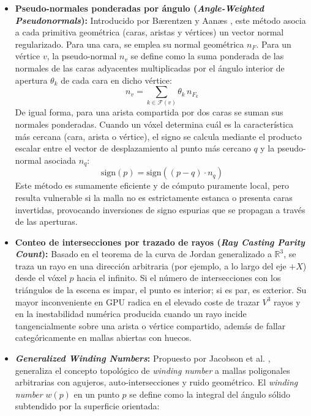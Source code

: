 \begin{itemize}
  \item \textbf{Pseudo-normales ponderadas por ángulo (\textit{Angle-Weighted Pseudonormals}):} Introducido por Bærentzen y Aanæs \cite{baerentzen2005}, este método asocia a cada primitiva geométrica (caras, aristas y vértices) un vector normal regularizado. Para una cara, se emplea su normal geométrica $n_F$. Para un vértice $v$, la pseudo-normal $n_v$ se define como la suma ponderada de las normales de las caras adyacentes multiplicadas por el ángulo interior de apertura $\theta_k$ de cada cara en dicho vértice:
  \begin{equation}
    n_v = \sum_{k \in \mathcal{F}(v)} \theta_k \, n_{F_k}
  \end{equation}
  De igual forma, para una arista compartida por dos caras se suman sus normales ponderadas. Cuando un vóxel determina cuál es la característica más cercana (cara, arista o vértice), el signo se calcula mediante el producto escalar entre el vector de desplazamiento al punto más cercano $q$ y la pseudo-normal asociada $n_q$:
  \begin{equation}
    \text{sign}(p) = \text{sign}\left( (p - q) \cdot n_q \right)
  \end{equation}
  Este método es sumamente eficiente y de cómputo puramente local, pero resulta vulnerable si la malla no es estrictamente estanca o presenta caras invertidas, provocando inversiones de signo espurias que se propagan a través de las aperturas.
  \item \textbf{Conteo de intersecciones por trazado de rayos (\textit{Ray Casting Parity Count}):} Basado en el teorema de la curva de Jordan generalizado a $\mathbb{R}^3$, se traza un rayo en una dirección arbitraria (por ejemplo, a lo largo del eje $+X$) desde el vóxel $p$ hacia el infinito. Si el número de intersecciones con los triángulos de la escena es impar, el punto es interior; si es par, es exterior. Su mayor inconveniente en GPU radica en el elevado coste de trazar $V^3$ rayos y en la inestabilidad numérica producida cuando un rayo incide tangencialmente sobre una arista o vértice compartido, además de fallar categóricamente en mallas abiertas con huecos.
  \item \textbf{\textit{Generalized Winding Numbers}:} Propuesto por Jacobson et al. \cite{jacobson2013}, generaliza el concepto topológico de \textit{winding number} a mallas poligonales arbitrarias con agujeros, auto-intersecciones y ruido geométrico. El \textit{winding number} $w(p)$ en un punto $p$ se define como la integral del ángulo sólido subtendido por la superficie orientada:

\end{itemize}
